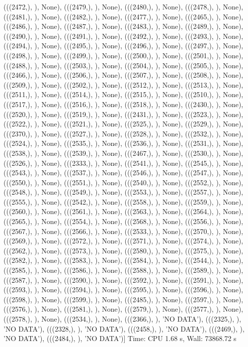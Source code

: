  (((2472,), {}), None),
 (((2479,), {}), None),
 (((2480,), {}), None),
 (((2478,), {}), None),
 (((2481,), {}), None),
 (((2482,), {}), None),
 (((2477,), {}), None),
 (((2465,), {}), None),
 (((2486,), {}), None),
 (((2487,), {}), None),
 (((2483,), {}), None),
 (((2489,), {}), None),
 (((2490,), {}), None),
 (((2491,), {}), None),
 (((2492,), {}), None),
 (((2493,), {}), None),
 (((2494,), {}), None),
 (((2495,), {}), None),
 (((2496,), {}), None),
 (((2497,), {}), None),
 (((2498,), {}), None),
 (((2499,), {}), None),
 (((2500,), {}), None),
 (((2501,), {}), None),
 (((2488,), {}), None),
 (((2503,), {}), None),
 (((2504,), {}), None),
 (((2505,), {}), None),
 (((2466,), {}), None),
 (((2506,), {}), None),
 (((2507,), {}), None),
 (((2508,), {}), None),
 (((2509,), {}), None),
 (((2502,), {}), None),
 (((2512,), {}), None),
 (((2513,), {}), None),
 (((2511,), {}), None),
 (((2514,), {}), None),
 (((2515,), {}), None),
 (((2510,), {}), None),
 (((2517,), {}), None),
 (((2516,), {}), None),
 (((2518,), {}), None),
 (((2430,), {}), None),
 (((2520,), {}), None),
 (((2519,), {}), None),
 (((2431,), {}), None),
 (((2523,), {}), None),
 (((2522,), {}), None),
 (((2521,), {}), None),
 (((2525,), {}), None),
 (((2529,), {}), None),
 (((2370,), {}), None),
 (((2527,), {}), None),
 (((2528,), {}), None),
 (((2532,), {}), None),
 (((2524,), {}), None),
 (((2535,), {}), None),
 (((2536,), {}), None),
 (((2531,), {}), None),
 (((2538,), {}), None),
 (((2539,), {}), None),
 (((2467,), {}), None),
 (((2530,), {}), None),
 (((2526,), {}), None),
 (((2333,), {}), None),
 (((2541,), {}), None),
 (((2545,), {}), None),
 (((2543,), {}), None),
 (((2537,), {}), None),
 (((2546,), {}), None),
 (((2547,), {}), None),
 (((2550,), {}), None),
 (((2551,), {}), None),
 (((2540,), {}), None),
 (((2552,), {}), None),
 (((2548,), {}), None),
 (((2549,), {}), None),
 (((2553,), {}), None),
 (((2557,), {}), None),
 (((2555,), {}), None),
 (((2542,), {}), None),
 (((2558,), {}), None),
 (((2559,), {}), None),
 (((2560,), {}), None),
 (((2561,), {}), None),
 (((2563,), {}), None),
 (((2564,), {}), None),
 (((2565,), {}), None),
 (((2554,), {}), None),
 (((2568,), {}), None),
 (((2556,), {}), None),
 (((2567,), {}), None),
 (((2566,), {}), None),
 (((2533,), {}), None),
 (((2570,), {}), None),
 (((2569,), {}), None),
 (((2572,), {}), None),
 (((2571,), {}), None),
 (((2574,), {}), None),
 (((2562,), {}), None),
 (((2573,), {}), None),
 (((2580,), {}), None),
 (((2575,), {}), None),
 (((2582,), {}), None),
 (((2583,), {}), None),
 (((2584,), {}), None),
 (((2544,), {}), None),
 (((2585,), {}), None),
 (((2586,), {}), None),
 (((2588,), {}), None),
 (((2589,), {}), None),
 (((2587,), {}), None),
 (((2590,), {}), None),
 (((2592,), {}), None),
 (((2591,), {}), None),
 (((2593,), {}), None),
 (((2594,), {}), None),
 (((2595,), {}), None),
 (((2596,), {}), None),
 (((2598,), {}), None),
 (((2599,), {}), None),
 (((2485,), {}), None),
 (((2597,), {}), None),
 (((2576,), {}), None),
 (((2581,), {}), None),
 (((2579,), {}), None),
 (((2577,), {}), None),
 (((2578,), {}), None),
 (((2534,), {}), None),
 (((2366,), {}), 'NO DATA'),
 (((2325,), {}), 'NO DATA'),
 (((2328,), {}), 'NO DATA'),
 (((2458,), {}), 'NO DATA'),
 (((2469,), {}), 'NO DATA'),
 (((2484,), {}), 'NO DATA')]
Time: CPU 1.68 s, Wall: 73868.72 s
  

